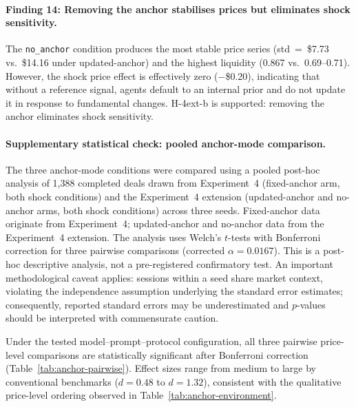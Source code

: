 \paragraph{Finding 14: Removing the anchor stabilises prices but eliminates shock sensitivity.}
The \texttt{no\_anchor} condition produces the most stable price series (std~=~\$7.73 vs.\ \$14.16 under updated-anchor) and the highest liquidity (0.867 vs.\ 0.69--0.71).  However, the shock price effect is effectively zero ($-$\$0.20), indicating that without a reference signal, agents default to an internal prior and do not update it in response to fundamental changes.  H-4ext-b is supported: removing the anchor eliminates shock sensitivity.

\paragraph{Supplementary statistical check: pooled anchor-mode comparison.}
The three anchor-mode conditions were compared using a pooled post-hoc analysis of 1{,}388 completed deals drawn from Experiment~4 (fixed-anchor arm, both shock conditions) and the Experiment~4 extension (updated-anchor and no-anchor arms, both shock conditions) across three seeds.  Fixed-anchor data originate from Experiment~4; updated-anchor and no-anchor data from the Experiment~4 extension.  The analysis uses Welch's $t$-tests with Bonferroni correction for three pairwise comparisons (corrected $\alpha = 0.0167$).  This is a post-hoc descriptive analysis, not a pre-registered confirmatory test.  An important methodological caveat applies: sessions within a seed share market context, violating the independence assumption underlying the standard error estimates; consequently, reported standard errors may be underestimated and $p$-values should be interpreted with commensurate caution.

Under the tested model--prompt--protocol configuration, all three pairwise price-level comparisons are statistically significant after Bonferroni correction (Table~\ref{tab:anchor-pairwise}).  Effect sizes range from medium to large by conventional benchmarks ($d = 0.48$ to $d = 1.32$), consistent with the qualitative price-level ordering observed in Table~\ref{tab:anchor-environment}.

